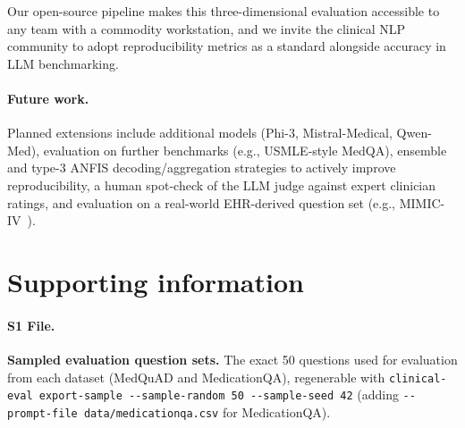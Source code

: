 \documentclass[10pt,letterpaper]{article}
\begin{document}
Our open-source pipeline makes this three-dimensional evaluation
accessible to any team with a commodity workstation, and we invite
the clinical NLP community to adopt reproducibility metrics as a
standard alongside accuracy in LLM benchmarking.

\paragraph{Future work.}
Planned extensions include additional models (Phi-3, Mistral-Medical,
Qwen-Med), evaluation on further benchmarks (e.g., USMLE-style MedQA),
ensemble and type-3 ANFIS decoding/aggregation strategies to actively
improve reproducibility, a human spot-check of the LLM judge against
expert clinician ratings, and evaluation on a real-world EHR-derived
question set (e.g., MIMIC-IV~\cite{johnson2023mimic}).

\nolinenumbers
\section*{Supporting information}

\paragraph*{S1 File.}
\label{S1_File}
{\bf Sampled evaluation question sets.} The exact 50 questions used for
evaluation from each dataset (MedQuAD and MedicationQA), regenerable with
\texttt{clinical-eval export-sample -{}-sample-random 50 -{}-sample-seed 42}
(adding \texttt{-{}-prompt-file data/medicationqa.csv} for MedicationQA).
\end{document}
